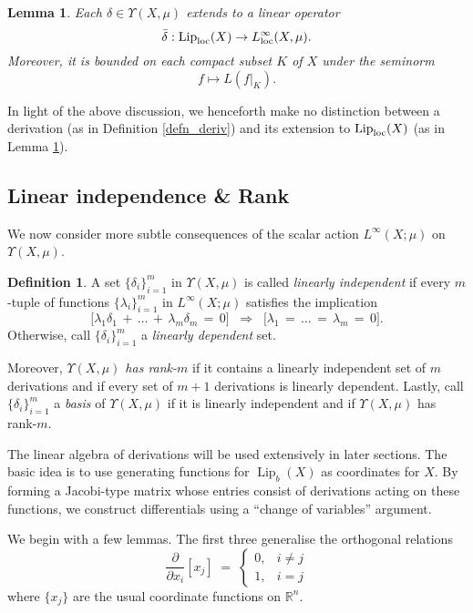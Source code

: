 \documentclass[reqno]{amsart}
\theoremstyle{plain}
\newtheorem{lemma}[thm]{Lemma}
\theoremstyle{definition}
\newtheorem{defn}[thm]{Definition}
\theoremstyle{remark}
\numberwithin{equation}{section}
\renewcommand{\d}{\delta}
\newcommand{\Lip}{\operatorname{Lip}}
\newcommand{\R}{\mathbb{R}}
\newcommand{\U}{\Upsilon}
\begin{document}
\begin{lemma} \label{lemma_extlip}
Each $\d \in \U(X,\mu)$ extends to a linear operator
$$
\bar\d : \Lip_{\rm loc}(X) \to L^\infty_{\rm loc}(X,\mu).
$$
Moreover, it is bounded on each compact subset $K$ of $X$ under the seminorm
$$
f \mapsto L(f|_K).
$$
\end{lemma}

In light of the above discussion, we henceforth make no distinction between a derivation (as in Definition \ref{defn_deriv}) and its extension to $\Lip_{\rm loc}(X)$ (as in Lemma \ref{lemma_extlip}).


\subsection{Linear independence \& Rank}

We now consider more subtle consequences of the scalar action $L^\infty(X;\mu)$ on $\U(X,\mu)$.

\begin{defn}
A set $\{\d_i\}_{i=1}^m$ in $\U(X,\mu)$ is called {\em linearly independent} if every $m$-tuple of functions $\{\lambda_i\}_{i=1}^m$ in $L^\infty(X;\mu)$ satisfies the implication
$$
\big[ \lambda_1 \d_1 \,+\, \ldots \,+\, \lambda_m\d_m \,=\, 0 \big]
\; \; \Longrightarrow \; \;
\big[ \lambda_1 \,=\, \ldots \,=\, \lambda_m \,=\, 0 \big].
$$
Otherwise, call $\{\d_i\}_{i=1}^m$ a {\em linearly dependent} set.

Moreover, {\em $\U(X,\mu)$ has rank-$m$} if it contains a linearly independent set of $m$ derivations and if every set of $m+1$ derivations is linearly dependent.  Lastly, call $\{\d_i\}_{i=1}^m$ a {\em basis} of $\U(X,\mu)$ if it is linearly independent and if $\U(X,\mu)$ has rank-$m$.
\end{defn}

The linear algebra of derivations will be used extensively in later sections.  The basic idea is to use generating functions for $\Lip_b(X)$ as coordinates for $X$.  By forming a Jacobi-type matrix whose entries consist of derivations acting on these functions, we construct differentials using a ``change of variables'' argument.

We begin with a few lemmas.  The first three generalise the orthogonal relations 
$$
\frac{\partial}{\partial x_i}[x_j] \;=\; 
\left\{
\begin{array}{rl}
0,& i \neq j \\
1,& i = j
\end{array}
\right.
$$
where $\{x_j\}$ are the usual coordinate functions on $\R^n$.
\end{document}
